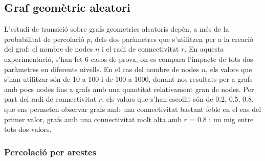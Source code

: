 \documentclass[a4paper]{article}
\begin{document}
	
	\subsection{Graf geomètric aleatori}

	L'estudi de transició sobre grafs geometrics aleatoris depèn, a més de la probabilitat de percolació $p$, dels dos paràmetres que s'utilitzen per a la creació del graf: el nombre de nodes $n$ i el radi de connectivitat $r$.
	En aquesta experimentació, s'han fet 6 casos de prova, on es compara l'impacte de tots dos paràmetres en diferents nivells. En el cas del nombre de nodes $n$, els valors que s'han utilitzar són de 10 a 100 i de 100 a 1000,
	donant-nos resultats per a grafs amb pocs nodes fins a grafs amb una quantitat relativament gran de nodes. Per part del radi de connectivitat $r$, els valors que s'han escollit són de 0.2, 0.5, 0.8, que ens permeten observar grafs amb una connectivitat
	bastant feble en el cas del primer valor, grafs amb una connectivitat molt alta amb $r$ = 0.8 i un mig entre tots dos valors.

	\subsubsection{Percolació per arestes}
\end{document}
